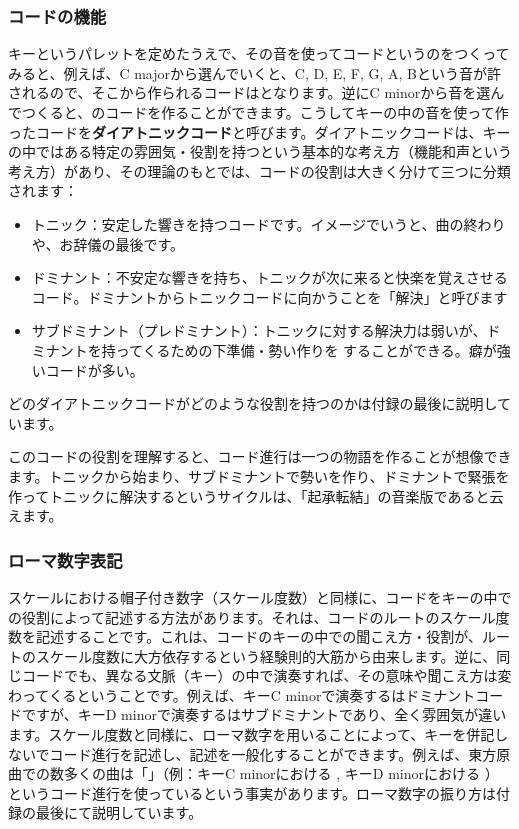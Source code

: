 \documentclass[11pt]{ltjarticle}
\newcommand{\wc}{\writechord}
\begin{document}
\subsubsection{コードの機能}
キーというパレットを定めたうえで、その音を使ってコードというのをつくってみると、例えば、C majorから選んでいくと、C, D, E, F, G, A, Bという音が許されるので、そこから作られるコードはとなります。逆にC minorから音を選んでつくると、のコードを作ることができます。こうしてキーの中の音を使って作ったコードを\textbf{ダイアトニックコード}と呼びます。ダイアトニックコードは、キーの中ではある特定の雰囲気・役割を持つという基本的な考え方（機能和声という考え方）があり、その理論のもとでは、コードの役割は大きく分けて三つに分類されます：
\begin{itemize}
    \item トニック：安定した響きを持つコードです。イメージでいうと、曲の終わりや、お辞儀の最後です。
    \item ドミナント：不安定な響きを持ち、トニックが次に来ると快楽を覚えさせるコード。ドミナントからトニックコードに向かうことを「解決」と呼びます
    \item サブドミナント（プレドミナント）：トニックに対する解決力は弱いが、ドミナントを持ってくるための下準備・勢い作りを
することができる。癖が強いコードが多い。
\end{itemize}
どのダイアトニックコードがどのような役割を持つのかは付録の最後に説明しています。\par
このコードの役割を理解すると、コード進行は一つの物語を作ることが想像できます。トニックから始まり、サブドミナントで勢いを作り、ドミナントで緊張を作ってトニックに解決するというサイクルは、「起承転結」の音楽版であると云えます。
\subsubsection{ローマ数字表記}
スケールにおける帽子付き数字（スケール度数）と同様に、コードをキーの中での役割によって記述する方法があります。それは、コードのルートのスケール度数を記述することです。これは、コードのキーの中での聞こえ方・役割が、ルートのスケール度数に大方依存するという経験則的大筋から由来します。逆に、同じコードでも、異なる文脈（キー）の中で演奏すれば、その意味や聞こえ方は変わってくるということです。例えば、キーC minorで演奏するはドミナントコードですが、キーD minorで演奏するはサブドミナントであり、全く雰囲気が違います。スケール度数と同様に、ローマ数字を用いることによって、キーを併記しないでコード進行を記述し、記述を一般化することができます。例えば、東方原曲での数多くの曲は「」（例：キーC minorにおける \wc{Bb} \wc{Cm}, キーD minorにおける  ）というコード進行を使っているという事実があります。ローマ数字の振り方は付録の最後にて説明しています。
\end{document}
